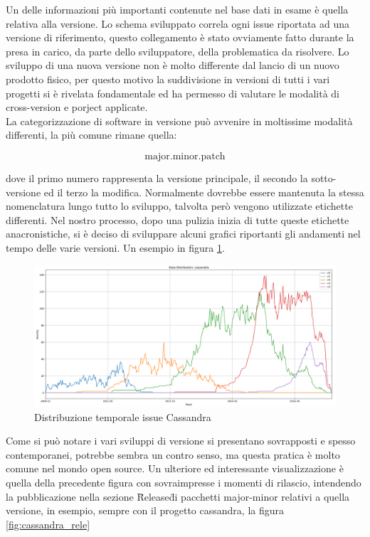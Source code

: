 \documentclass[%
    corpo=12pt,
    twoside,
    oldstyle,
    autoretitolo,
    greek,
    evenboxes,
]{toptesi}
\begin{document}
Un delle informazioni più importanti contenute nel base dati in esame è quella relativa alla versione. Lo schema sviluppato correla ogni issue riportata ad una versione di riferimento, questo collegamento è stato ovviamente fatto durante la presa in carico, da parte dello sviluppatore, della problematica da risolvere. Lo sviluppo di una nuova versione non è molto differente dal lancio di un nuovo prodotto fisico, per questo motivo la suddivisione in versioni di tutti i vari progetti si è rivelata fondamentale ed ha permesso di valutare le modalità di cross-version e porject applicate.\\
La categorizzazione di software in versione può avvenire in moltissime modalità differenti, la più comune rimane quella:
\begin{center}
  \begin{equation}
    \textrm{major}.\textrm{minor}.\textrm{patch}
  \end{equation}
\end{center}
dove il primo numero rappresenta la versione principale, il secondo la sotto-versione ed il terzo la modifica. Normalmente dovrebbe essere mantenuta la stessa nomenclatura lungo tutto lo sviluppo, talvolta però vengono utilizzate etichette differenti. Nel nostro processo, dopo una pulizia inizia di tutte queste etichette anacronistiche, si è deciso di sviluppare alcuni grafici riportanti gli andamenti nel tempo delle varie versioni. Un esempio in figura \ref{fig:cassandra_vers1}.
\begin{figure}[!ht]
  \includegraphics[width=\linewidth]{figure/cassandra_vers.png}
  \caption{Distribuzione temporale issue Cassandra}
  \label{fig:cassandra_vers1}
\end{figure}
Come si può notare i vari sviluppi di versione si presentano sovrapposti e spesso contemporanei, potrebbe sembra un contro senso, ma questa pratica è molto comune nel mondo open source. Un ulteriore ed interessante visualizzazione è quella della precedente figura con sovraimpresse i momenti di rilascio, intendendo la pubblicazione nella sezione \"Release\" di pacchetti major-minor relativi a quella versione, in esempio, sempre con il progetto cassandra, la figura \ref{fig:cassandra_rele} 
\end{document}
